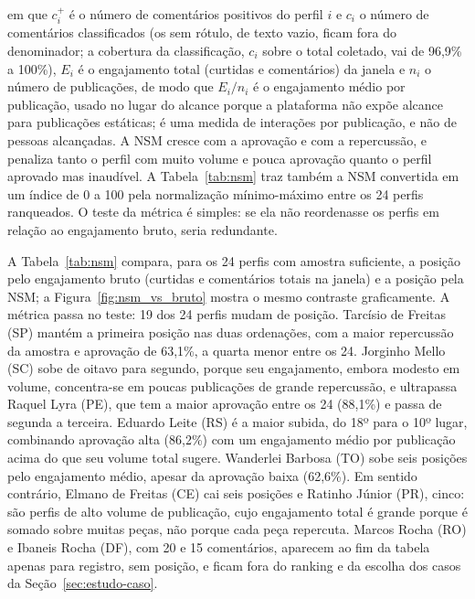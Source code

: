 \noindent em que $c^{+}_i$ é o número de comentários positivos do perfil $i$ e $c_i$ o número de comentários classificados (os sem rótulo, de texto vazio, ficam fora do denominador; a cobertura da classificação, $c_i$ sobre o total coletado, vai de 96,9\% a 100\%), $E_i$ é o engajamento total (curtidas e comentários) da janela e $n_i$ o número de publicações, de modo que $E_i/n_i$ é o engajamento médio por publicação, usado no lugar do alcance porque a plataforma não expõe alcance para publicações estáticas; é uma medida de interações por publicação, e não de pessoas alcançadas. A NSM cresce com a aprovação e com a repercussão, e penaliza tanto o perfil com muito volume e pouca aprovação quanto o perfil aprovado mas inaudível. A Tabela~\ref{tab:nsm} traz também a NSM convertida em um índice de 0 a 100 pela normalização mínimo-máximo entre os 24 perfis ranqueados. O teste da métrica é simples: se ela não reordenasse os perfis em relação ao engajamento bruto, seria redundante.

A Tabela~\ref{tab:nsm} compara, para os 24 perfis com amostra suficiente, a posição pelo engajamento bruto (curtidas e comentários totais na janela) e a posição pela NSM; a Figura~\ref{fig:nsm_vs_bruto} mostra o mesmo contraste graficamente. A métrica passa no teste: 19 dos 24 perfis mudam de posição. Tarcísio de Freitas (SP) mantém a primeira posição nas duas ordenações, com a maior repercussão da amostra e aprovação de 63,1\%, a quarta menor entre os 24. Jorginho Mello (SC) sobe de oitavo para segundo, porque seu engajamento, embora modesto em volume, concentra-se em poucas publicações de grande repercussão, e ultrapassa Raquel Lyra (PE), que tem a maior aprovação entre os 24 (88,1\%) e passa de segunda a terceira. Eduardo Leite (RS) é a maior subida, do 18º para o 10º lugar, combinando aprovação alta (86,2\%) com um engajamento médio por publicação acima do que seu volume total sugere. Wanderlei Barbosa (TO) sobe seis posições pelo engajamento médio, apesar da aprovação baixa (62,6\%). Em sentido contrário, Elmano de Freitas (CE) cai seis posições e Ratinho Júnior (PR), cinco: são perfis de alto volume de publicação, cujo engajamento total é grande porque é somado sobre muitas peças, não porque cada peça repercuta. Marcos Rocha (RO) e Ibaneis Rocha (DF), com 20 e 15 comentários, aparecem ao fim da tabela apenas para registro, sem posição, e ficam fora do ranking e da escolha dos casos da Seção~\ref{sec:estudo-caso}.

